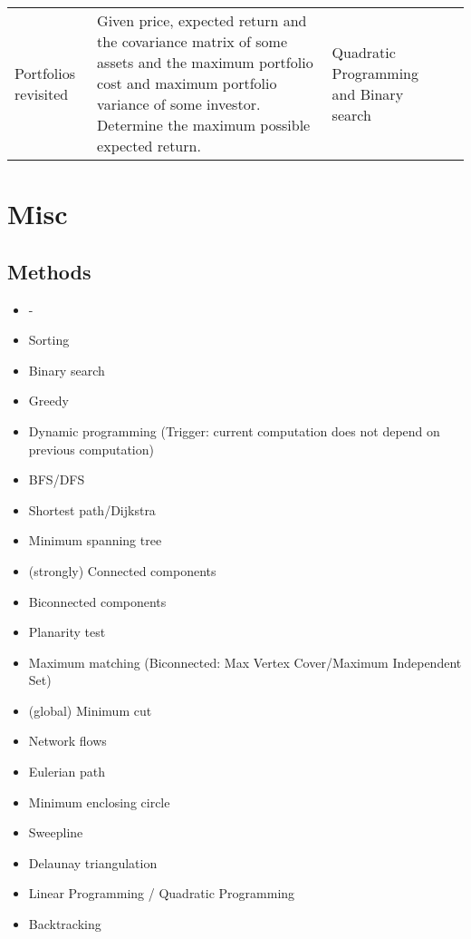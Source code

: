 \documentclass[a4paper, 10pt]{article}
\let\stdsection\section
\renewcommand\section{\newpage\stdsection}
\begin{document}
\begin{longtable}{ L{2cm} L{8cm} L{4cm} r}
        Portfolios revisited 
        & Given price, expected return and the covariance matrix of some assets 
            and the maximum portfolio cost and maximum portfolio variance of some investor. 
            Determine the maximum possible expected return.
            & Quadratic Programming and Binary search &  \pageref{sec:portfolios_revisited} \\




    \end{longtable}    


    \section{Misc}
        \subsection*{Methods}
            \begin{itemize}
                \item -
                \item Sorting
                \item Binary search
                \item Greedy
                \item Dynamic programming (Trigger: current computation does not depend on previous computation)
                \item BFS/DFS
                \item Shortest path/Dijkstra
                \item Minimum spanning tree
                \item (strongly) Connected components
                \item Biconnected components 
                \item Planarity test 
                \item Maximum matching (Biconnected: Max Vertex Cover/Maximum Independent Set)
                \item (global) Minimum cut
                \item Network flows
                \item Eulerian path
                \item Minimum enclosing circle
                \item Sweepline
                \item Delaunay triangulation
                \item Linear Programming / Quadratic Programming
                \item Backtracking
            \end{itemize}
\end{document}
